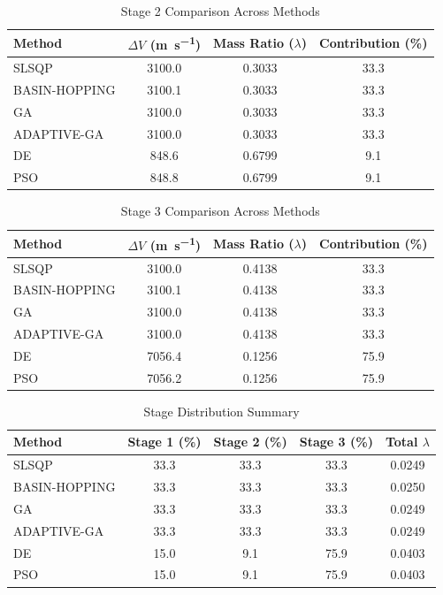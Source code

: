 \documentclass{article}
\begin{document}
\begin{table}[H]
\centering
\caption{Stage 2 Comparison Across Methods}
\begin{tabular}{lS[table-format=4.1]S[table-format=1.4]S[table-format=3.1]}
\toprule
Method & {$\Delta V$ (\si{\meter\per\second})} & {Mass Ratio ($\lambda$)} & {Contribution (\%)} \\
\midrule
SLSQP        & 3100.0 & 0.3033 & 33.3 \\
BASIN-HOPPING & 3100.1 & 0.3033 & 33.3 \\
GA           & 3100.0 & 0.3033 & 33.3 \\
ADAPTIVE-GA  & 3100.0 & 0.3033 & 33.3 \\
DE           & 848.6 & 0.6799 & 9.1 \\
PSO          & 848.8 & 0.6799 & 9.1 \\
\bottomrule
\end{tabular}
\end{table}

\begin{table}[H]
\centering
\caption{Stage 3 Comparison Across Methods}
\begin{tabular}{lS[table-format=4.1]S[table-format=1.4]S[table-format=3.1]}
\toprule
Method & {$\Delta V$ (\si{\meter\per\second})} & {Mass Ratio ($\lambda$)} & {Contribution (\%)} \\
\midrule
SLSQP        & 3100.0 & 0.4138 & 33.3 \\
BASIN-HOPPING & 3100.1 & 0.4138 & 33.3 \\
GA           & 3100.0 & 0.4138 & 33.3 \\
ADAPTIVE-GA  & 3100.0 & 0.4138 & 33.3 \\
DE           & 7056.4 & 0.1256 & 75.9 \\
PSO          & 7056.2 & 0.1256 & 75.9 \\
\bottomrule
\end{tabular}
\end{table}

\begin{table}[H]
\centering
\caption{Stage Distribution Summary}
\begin{tabular}{lS[table-format=4.1]S[table-format=4.1]S[table-format=4.1]S[table-format=1.4]}
\toprule
Method & {Stage 1 (\%)} & {Stage 2 (\%)} & {Stage 3 (\%)} & {Total $\lambda$} \\
\midrule
SLSQP        & 33.3 & 33.3 & 33.3 & 0.0249 \\
BASIN-HOPPING & 33.3 & 33.3 & 33.3 & 0.0250 \\
GA           & 33.3 & 33.3 & 33.3 & 0.0249 \\
ADAPTIVE-GA  & 33.3 & 33.3 & 33.3 & 0.0249 \\
DE           & 15.0 & 9.1 & 75.9 & 0.0403 \\
PSO          & 15.0 & 9.1 & 75.9 & 0.0403 \\
\bottomrule
\end{tabular}
\end{table}
\end{document}
